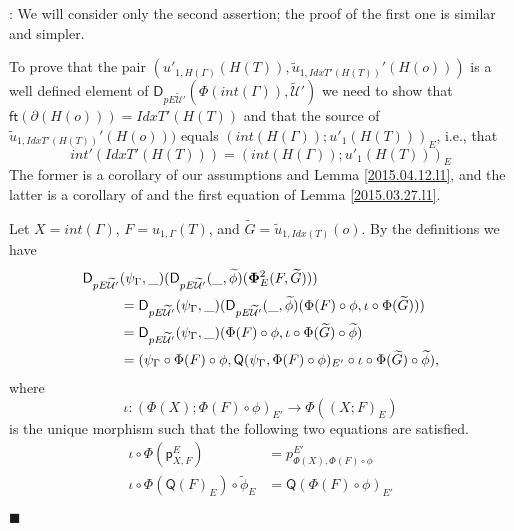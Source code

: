 \documentclass[12pt]{article}
\numberwithin{equation}{section}
\newenvironment{myproof}{{\bf Proof}:}{$\blacksquare$ \vskip 5mm }
\newcommand{\sr}{\rightarrow}
\newcommand{\wt}{\widetilde}
\newcommand{\ft}{\mathsf{ft}}
\newcommand{\p}{\mathsf{p}}
\newcommand{\U}{\mathcal{U}}
\newcommand{\D}{\mathsf{D}}
\newcommand{\Q}{\mathsf{Q}}
\begin{document}
\begin{myproof}
We will consider only the second assertion; the proof of the first one is
similar and simpler.

To prove that the pair $(u'_{1,H(\Gamma)}(H(T)),
\wt{u}_{1,IdxT'(H(T))}'(H(o)))$ is a well defined element of
$\D_{pE\wt{\U}'}(\Phi(int(\Gamma)),\wt{\U}')$ we need to show that
$\ft(\partial(H(o)))=IdxT'(H(T))$ and that the source of
$\wt{u}_{1,IdxT'(H(T))}'(H(o)))$ equals $(int(H(\Gamma)); u'_1(H(T)))_{E}$,
i.e., that
%
$$int'(IdxT'(H(T)))=(int(H(\Gamma)); u'_1(H(T)))_{E}$$
%
The former is a corollary of our assumptions and Lemma \ref{2015.04.12.l1}, and
the latter is a corollary of \cite[Problem 3.3(1)]{fromunivwithPi} and the
first equation of Lemma \ref{2015.03.27.l1}.

Let $X=int(\Gamma)$, $F=u_{1,\Gamma}(T)$, and $\wt{G}=\wt{u}_{1,Idx(T)}(o)$. By
the definitions we have
%
\begin{align*}
  \D_{pE\wt{\U}'}&(\psi_{\Gamma},\_)(\D_{pE\wt{\U}'}(\_,\wt{\phi})({\bf\Phi}_{E}^2(F,\wt{G}))) \\
    & = \D_{pE\wt{\U}'}(\psi_{\Gamma},\_)(\D_{pE\wt{\U}'}(\_,\wt{\phi})(\Phi(F)\circ \phi, \iota\circ \Phi(\wt{G}))) \\
    & = \D_{pE\wt{\U}'}(\psi_{\Gamma},\_)(\Phi(F)\circ \phi, \iota\circ \Phi(\wt{G})\circ\wt{\phi}) \\
    & = (\psi_{\Gamma}\circ\Phi(F)\circ \phi, \Q(\psi_{\Gamma},\Phi(F)\circ\phi)_{E'}\circ\iota\circ \Phi(\wt{G})\circ\wt{\phi}),
\end{align*}
%
where
%
$$\iota:(\Phi(X);\Phi(F)\circ \phi)_{E'}\sr \Phi((X;F)_{E})$$
%
is the unique morphism such that the following two equations are satisfied.
%
\begin{align}
  \iota \circ \Phi(\p^E_{X,F})               & = p^{E'}_{\Phi(X),\Phi(F)\circ\phi}         \label{iota1} \\
  \iota \circ \Phi(\Q(F)_E)\circ \wt{\phi}_E & = \Q(\Phi(F)\circ\phi)_{E'}                 \label{iota2}
\end{align}


\end{myproof}
\end{document}
